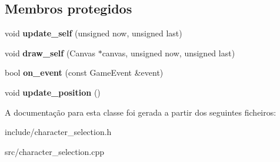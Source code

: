 \subsection*{Membros protegidos}
\begin{DoxyCompactItemize}
\item 
\mbox{\label{classCharacterSelection_ae398845f5f793f40ddf8314a0ad16f7e}} 
void {\bfseries update\+\_\+self} (unsigned now, unsigned last)
\item 
\mbox{\label{classCharacterSelection_a474bb5f07bc3c530b4988a463ff83bb5}} 
void {\bfseries draw\+\_\+self} (Canvas $\ast$canvas, unsigned now, unsigned last)
\item 
\mbox{\label{classCharacterSelection_af7d87f81c8bc895a89d9f13c09ed6b35}} 
bool {\bfseries on\+\_\+event} (const Game\+Event \&event)
\item 
\mbox{\label{classCharacterSelection_aa0a17d7b1a2092b9346c626d8c097253}} 
void {\bfseries update\+\_\+position} ()
\end{DoxyCompactItemize}


A documentação para esta classe foi gerada a partir dos seguintes ficheiros\+:\begin{DoxyCompactItemize}
\item 
include/character\+\_\+selection.\+h\item 
src/character\+\_\+selection.\+cpp\end{DoxyCompactItemize}
